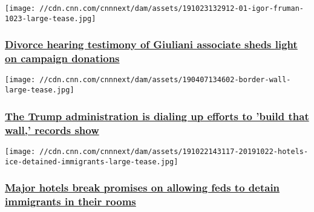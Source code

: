 \href{/2019/11/22/politics/giuliani-associate-igor-fruman-divorce-finances-invs/index.html}{}

\texttt{[image: //cdn.cnn.com/cnnnext/dam/assets/191023132912-01-igor-fruman-1023-large-tease.jpg]}

\hypertarget{divorce-hearing-testimony-of-giuliani-associate-sheds-light-on-campaign-donations}{%
\subsubsection{\texorpdfstring{\href{/2019/11/22/politics/giuliani-associate-igor-fruman-divorce-finances-invs/index.html}{Divorce
hearing testimony of Giuliani associate sheds light on campaign
donations}}{Divorce hearing testimony of Giuliani associate sheds light on campaign donations}}\label{divorce-hearing-testimony-of-giuliani-associate-sheds-light-on-campaign-donations}}

\href{/2019/11/22/us/trump-administration-seizing-border-wall-land/index.html}{}

\texttt{[image: //cdn.cnn.com/cnnnext/dam/assets/190407134602-border-wall-large-tease.jpg]}

\hypertarget{the-trump-administration-is-dialing-up-efforts-to-build-that-wall-records-show}{%
\subsubsection{\texorpdfstring{\href{/2019/11/22/us/trump-administration-seizing-border-wall-land/index.html}{The
Trump administration is dialing up efforts to 'build that wall,' records
show}}{The Trump administration is dialing up efforts to 'build that wall,' records show}}\label{the-trump-administration-is-dialing-up-efforts-to-build-that-wall-records-show}}

\href{/2019/11/05/us/ice-hotels-immigrant-detention-invs/index.html}{}

\texttt{[image: //cdn.cnn.com/cnnnext/dam/assets/191022143117-20191022-hotels-ice-detained-immigrants-large-tease.jpg]}

\hypertarget{major-hotels-break-promises-on-allowing-feds-to-detain-immigrants-in-their-rooms}{%
\subsubsection{\texorpdfstring{\href{/2019/11/05/us/ice-hotels-immigrant-detention-invs/index.html}{Major
hotels break promises on allowing feds to detain immigrants in their
rooms}}{Major hotels break promises on allowing feds to detain immigrants in their rooms}}\label{major-hotels-break-promises-on-allowing-feds-to-detain-immigrants-in-their-rooms}}

